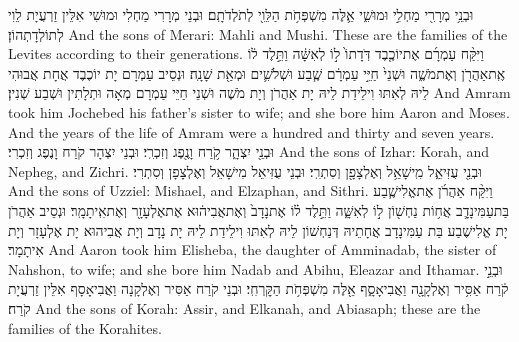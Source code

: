 {וּבְנֵ֥י מְרָרִ֖י מַחְלִ֣י וּמוּשִׁ֑י אֵ֛לֶּה מִשְׁפְּחֹ֥ת הַלֵּוִ֖י לְתֹלְדֹתָֽם׃}
{וּבְנֵי מְרָרִי מַחְלִי וּמוּשִׁי אִלֵּין זַרְעֲיָת לֵוִי לְתוֹלְדָתְהוֹן׃}
{And the sons of Merari: Mahli and Mushi. These are the families of the Levites according to their generations.}{}
{וַיִּקַּ֨ח עַמְרָ֜ם אֶת\maqqaf יוֹכֶ֤בֶד דֹּֽדָתוֹ֙ ל֣וֹ לְאִשָּׁ֔ה וַתֵּ֣לֶד ל֔וֹ אֶֽת\maqqaf אַהֲרֹ֖ן וְאֶת\maqqaf מֹשֶׁ֑ה וּשְׁנֵי֙ חַיֵּ֣י עַמְרָ֔ם שֶׁ֧בַע וּשְׁלֹשִׁ֛ים וּמְאַ֖ת שָׁנָֽה׃}
{וּנְסֵיב עַמְרָם יָת יוֹכֶבֶד אֲחָת אֲבוּהִי לֵיהּ לְאִתּוּ וִילֵידַת לֵיהּ יָת אַהֲרֹן וְיָת מֹשֶׁה וּשְׁנֵי חַיֵּי עַמְרָם מְאָה וּתְלָתִין וּשְׁבַע שְׁנִין׃}
{And Amram took him Jochebed his father’s sister to wife; and she bore him Aaron and Moses. And the years of the life of Amram were a hundred and thirty and seven years.}{}
{וּבְנֵ֖י יִצְהָ֑ר קֹ֥רַח וָנֶ֖פֶג וְזִכְרִֽי׃}
{וּבְנֵי יִצְהָר קֹרַח וָנֶפֶג וְזִכְרִי׃}
{And the sons of Izhar: Korah, and Nepheg, and Zichri.}{}
{וּבְנֵ֖י עֻזִּיאֵ֑ל מִֽישָׁאֵ֥ל וְאֶלְצָפָ֖ן וְסִתְרִֽי׃}
{וּבְנֵי עֻזִּיאֵל מִישָׁאֵל וְאֶלְצָפָן וְסִתְרִי׃}
{And the sons of Uzziel: Mishael, and Elzaphan, and Sithri.}{}
{וַיִּקַּ֨ח אַהֲרֹ֜ן אֶת\maqqaf אֱלִישֶׁ֧בַע בַּת\maqqaf עַמִּינָדָ֛ב אֲח֥וֹת נַחְשׁ֖וֹן ל֣וֹ לְאִשָּׁ֑ה וַתֵּ֣לֶד ל֗וֹ אֶת\maqqaf נָדָב֙ וְאֶת\maqqaf אֲבִיה֔וּא אֶת\maqqaf אֶלְעָזָ֖ר וְאֶת\maqqaf אִֽיתָמָֽר׃}
{וּנְסֵיב אַהֲרֹן יָת אֱלִישֶׁבַע בַּת עַמִּינָדָב אֲחָתֵיהּ דְּנַחְשׁוֹן לֵיהּ לְאִתּוּ וִילֵידַת לֵיהּ יָת נָדָב וְיָת אֲבִיהוּא יָת אֶלְעָזָר וְיָת אִיתָמָר׃}
{And Aaron took him Elisheba, the daughter of Amminadab, the sister of Nahshon, to wife; and she bore him Nadab and Abihu, Eleazar and Ithamar.}{}
{וּבְנֵ֣י קֹ֔רַח אַסִּ֥יר וְאֶלְקָנָ֖ה וַאֲבִיאָסָ֑ף אֵ֖לֶּה מִשְׁפְּחֹ֥ת הַקׇּרְחִֽי׃}
{וּבְנֵי קֹרַח אַסִּיר וְאֶלְקָנָה וַאֲבִיאָסָף אִלֵּין זַרְעֲיָת קֹרַח׃}
{And the sons of Korah: Assir, and Elkanah, and Abiasaph; these are the families of the Korahites.}{}
